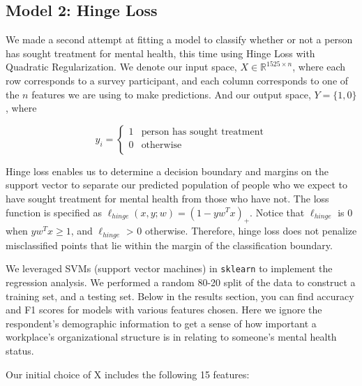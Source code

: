\documentclass[times, twocolumn]{article}
\begin{document}
\subsection{Model 2: Hinge Loss}

We made a second attempt at fitting a model to classify whether or not a person
has sought treatment for mental health, this time using Hinge Loss with Quadratic
Regularization. We denote our input space, $X \in \mathbb{R}^{1525 \times n}$,
where each row corresponds to a survey participant, and each column corresponds
to one of the $n$ features we are using to make predictions.
And our output space, $Y = \{1,0\}$, where

\[ y_i = \begin{cases}
      1 & \text{person has sought treatment} \\
      0 & \text{otherwise} \\
   \end{cases}
\]

Hinge loss enables us to determine a decision boundary and margins on the
support vector to separate our predicted population of people who we expect to
have sought treatment for mental health from those who have not. The loss
function is specified as $\ell_{hinge}(x, y; w) = (1-yw^Tx)_+$. Notice that
$\ell_{hinge}$ is 0 when $yw^Tx \geq 1$, and $\ell_{hinge}$ > 0 otherwise.
Therefore, hinge loss does not penalize misclassified points that lie within
the margin of the classification boundary.

We leveraged SVMs (support vector machines) in \texttt{sklearn} to implement
the regression analysis. We performed a random 80-20 split of the data to
construct a training set, and a testing set. Below in the results section,
you can find accuracy and F1 scores for models with various features chosen.
Here we ignore the respondent’s demographic information to get a sense of how
important a workplace’s organizational structure is in relating to someone’s
mental health status.


Our initial choice of X includes the following 15 features:
\end{document}
